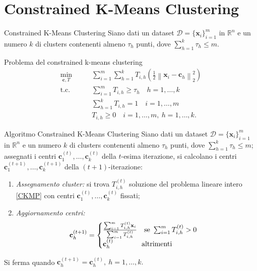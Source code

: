 \documentclass{beamer}
\begin{document}
\section{Constrained K-Means Clustering}
\begin{frame}{Constrained K-Means Clustering}
	Siano dati un dataset $\mathcal{D} = \{\textbf{x}_i\}^m_{i=1}$ in $\mathbb{R}^n$ e un numero $k$ di clusters contenenti almeno $ \tau_h $ punti, dove $ \sum_{h=1}^{k}\tau_h \le m $.
	\begin{block}{Problema del constrained k-means clustering}
		\vspace{-0.8cm}
		\begin{equation}
			\begin{split}
				\underset{\textbf{c}, T}{\text{min}}&\qquad \sum_{i=1}^{m}\sum_{h=1}^{k} T_{i,h} \left( \frac{1}{2} \left\| \textbf{x}_i - \textbf{c}_h \right\|^2_2  \right) \\
				\text{t.c.}&\qquad \sum_{i=1}^{m} T_{i,h} \ge \tau_h \quad h = 1, \dots,k\\
				& \qquad\sum_{h=1}^{k} T_{i,h} = 1 \quad i = 1, \dots, m\\
				& \qquad T_{i,h} \ge 0 \quad i = 1, \dots, m,\ h = 1, \dots,k.
			\end{split}
		\label{CKMP}
		\end{equation}
	\vspace{-0.5cm}
	\end{block}
\end{frame}
\begin{frame}
	\begin{block}{Algoritmo Constrained K-Means Clustering}
			Siano dati un dataset $\mathcal{D} = \{\textbf{x}_i\}^m_{i=1}$ in $\mathbb{R}^n$ e un numero $k$ di clusters contenenti almeno $ \tau_h $ punti, dove $ \sum_{h=1}^{k}\tau_h \le m $; assegnati i centri $ \textbf{c}_{1}^{(t)}, \dots, \textbf{c}_{k}^{(t)} $ della $ t $-esima iterazione, si calcolano i centri $ \textbf{c}_{1}^{(t+1)}, \dots, \textbf{c}_{k}^{(t+1)} $ della $ (t+1) $-iterazione:
			\begin{enumerate}
				\item \textit{Assegnamento cluster:} si trova $ T_{i,h}^{(t)} $ soluzione del problema lineare intero \eqref{CKMP} con centri $ \textbf{c}_{1}^{(t)}, \dots, \textbf{c}_{k}^{(t)} $ fissati;
				\item \textit{Aggiornamento centri:} 
				\vspace{-0.3cm}
				\[ \textbf{c}_{h}^{(t+1)} = \begin{cases}
					\frac{\sum_{i=1}^{m}T_{i,h}^{(t)}\textbf{x}_i}{\sum_{i=1}^{m}T_{i,h}^{(t)}} \quad \text{se} \ \sum_{i=1}^{m}T_{i,h}^{(t)} > 0\\
					\vspace{-0.5cm}\\
					\textbf{c}_{h}^{(t)}\qquad\qquad \text{altrimenti}
				\end{cases} \]
			\end{enumerate}
		\vspace{-0.3cm}
		Si ferma quando $\textbf{c}_{h}^{(t+1)} = \textbf{c}_{h}^{(t)}, \ h=1,\dots,k.$
	\end{block}
\end{frame}
\end{document}
